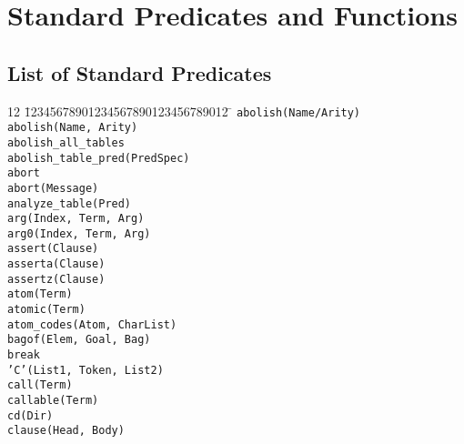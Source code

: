 \chapter{Standard Predicates and Functions} \label{standard_predicates}


\section{List of Standard Predicates}
\begin{tabbing}
12 \= 12345678901234567890123456789012 \=	\kill
 \> {\tt abolish(Name/Arity)}	\>					\\
 \> {\tt abolish(Name, Arity)}	\>					\\
 \> {\tt abolish\_all\_tables}	\>					\\
 \> {\tt abolish\_table\_pred(PredSpec)} \>				\\
 \> {\tt abort}			\>					\\
 \> {\tt abort(Message)}	\>					\\
 \> {\tt analyze\_table(Pred)}	\>					\\
 \> {\tt arg(Index, Term, Arg)}	\>					\\
 \> {\tt arg0(Index, Term, Arg)}\>					\\
 \> {\tt assert(Clause)}	\>					\\
 \> {\tt asserta(Clause)}	\>					\\
 \> {\tt assertz(Clause)}	\>					\\
 \> {\tt atom(Term)}		\>					\\
 \> {\tt atomic(Term)}		\>					\\
 \> {\tt atom\_codes(Atom, CharList)}	\>				\\
 \> {\tt bagof(Elem, Goal, Bag)}\>					\\
 \> {\tt break}			\>					\\
 \> {\tt 'C'(List1, Token, List2)} \>					\\
 \> {\tt call(Term)}		\>					\\
 \> {\tt callable(Term)}	\>					\\
 \> {\tt cd(Dir)}		\>					\\
 \> {\tt clause(Head, Body)}	\>					\\

\end{tabbing}
